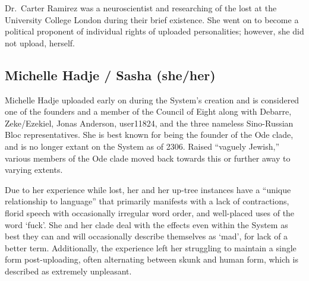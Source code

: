 Dr.~Carter Ramirez was a neuroscientist and researching of the lost at the University College London during their brief existence. She went on to become a political proponent of individual rights of uploaded personalities; however, she did not upload, herself.

\begin{comment}
\emph{Appears in:}

\begin{itemize}
\tightlist
\item
  \href{https://qoheleth.post-self.ink}{\emph{Qoheleth}}
\item
  \href{https://toledot.post-self.ink}{\emph{Toledot}} (mentioned)
\end{itemize}
\end{comment}

\subsection{Michelle Hadje / Sasha (she/her)}

Michelle Hadje uploaded early on during the System's creation and is considered one of the founders and a member of the Council of Eight along with Debarre, Zeke/Ezekiel, Jonas Anderson, user11824, and the three nameless Sino-Russian Bloc representatives. She is best known for being the founder of the Ode clade, and is no longer extant on the System as of 2306. Raised ``vaguely Jewish,'' various members of the Ode clade moved back towards this or further away to varying extents.

Due to her experience while lost, her and her up-tree instances have a ``unique relationship to language'' that primarily manifests with a lack of contractions, florid speech with occasionally irregular word order, and well-placed uses of the word `fuck'. She and her clade deal with the effects even within the System as best they can and will occasionally describe themselves as `mad', for lack of a better term. Additionally, the experience left her struggling to maintain a single form post-uploading, often alternating between skunk and human form, which is described as extremely unpleasant.

\begin{comment}
\emph{Appears in:}

\begin{itemize}
\tightlist
\item
  \href{https://qoheleth.post-self.ink}{\emph{Qoheleth}}
\item
  \href{https://toledot.post-self.ink}{\emph{Toledot}}
\item
  \href{https://neviim.post-self.ink}{\emph{Nevi'im}} (mentioned)
\item
  \href{https://mitzvot.post-self.ink}{\emph{Mitzvot}} (mentioned)
\end{itemize}
\end{comment}

